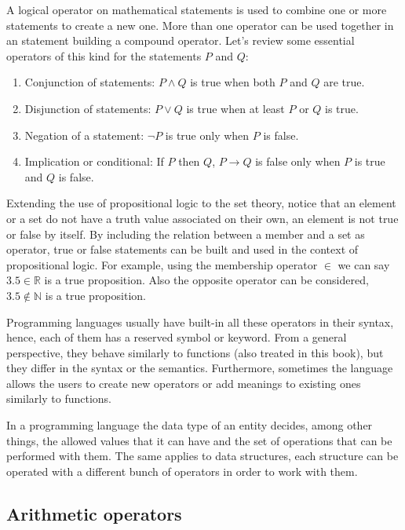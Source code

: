 A logical operator on mathematical statements is used to combine one or more statements to create a new one. 
More than one operator can be used together in an statement building a compound operator. 
Let's review some essential operators of this kind for the statements $P$ and $Q$:
\newpage
\begin{enumerate}[noitemsep]
    \item Conjunction of statements: $P \land Q$ is true when both $P$ and $Q$ are true.
    \item Disjunction of statements: $P\lor Q$ is true when at least $P$ or $Q$ is true.
    \item Negation of a statement: $\neg P$ is true only when $P$ is false.
    \item Implication or conditional: If $P$ then $Q$, $P\to Q$ is false only when $P$ is true and $Q$ is false. 
\end{enumerate}

Extending the use of propositional logic to the set theory, notice that an element or a set 
do not have a truth value associated on their own, an element is not true or false by itself. 
By including the relation between a member and a set as operator, true or false statements can be 
built and used in the context of propositional logic. 
For example, using the membership operator $\in$ we can say $3.5 \in \mathbb{R}$ is a true proposition. 
Also the opposite operator can be considered, $3.5 \notin \mathbb{N}$ is a true proposition.



Programming languages usually have built-in all these operators in their syntax,
hence, each of them has a reserved symbol or keyword.
From a general perspective, 
they behave similarly to functions (also treated in this book), 
but they differ in the syntax or the semantics. 
Furthermore, sometimes the language allows the users to create new operators 
or add meanings to existing ones similarly to functions. 

In a programming language the data type of an entity decides, among other things, 
the allowed values that it can have and 
the set of operations that can be performed with them.
The same applies to data structures, each structure can be operated 
with a different bunch of operators in order to work with them. 



        \subsection*{Arithmetic operators}
        
